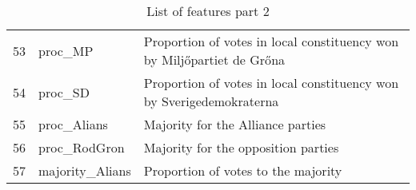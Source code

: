 \begin{table}[H]
\begin{tabular}{ | l | l | p{7cm} | }
53 & proc\_MP & Proportion of votes in local constituency won by Milj{\H o}partiet de Gr{\H o}na \\
54 & proc\_SD & Proportion of votes in local constituency won by Sverige\-demokraterna \\
55 & proc\_Alians & Majority for the Alliance parties \\
56 & proc\_RodGron & Majority for the opposition parties \\
57 & majority\_Alians & Proportion of votes to the majority \\
\hline
\end{tabular}
\caption{List of features part 2}
\label{tab:feature_list2}
\end{table}
